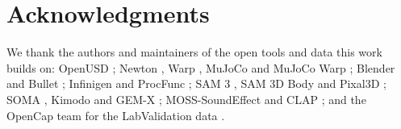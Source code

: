 \section*{Acknowledgments}\label{acknowledgments}

We thank the authors and maintainers of the open tools and data this work builds on: OpenUSD \citep{openusd}; Newton \citep{newton}, Warp \citep{warp}, MuJoCo \citep{todorov2012mujoco} and MuJoCo Warp \citep{mujocowarp}; Blender \citep{blender} and Bullet \citep{bullet}; Infinigen \citep{raistrick2023infinigen} and ProcFunc \citep{raistrick2026procfunc}; SAM 3 \citep{carion2025sam3}, SAM 3D Body \citep{yang2026sam3dbody} and Pixal3D \citep{li2026pixal3d}; SOMA \citep{saito2026soma}, Kimodo \citep{rempe2026kimodo} and GEM-X \citep{gemx}; MOSS-SoundEffect \citep{moss2026} and CLAP \citep{wu2022clap}; and the OpenCap team for the LabValidation data \citep{uhlrich2023opencap}.
